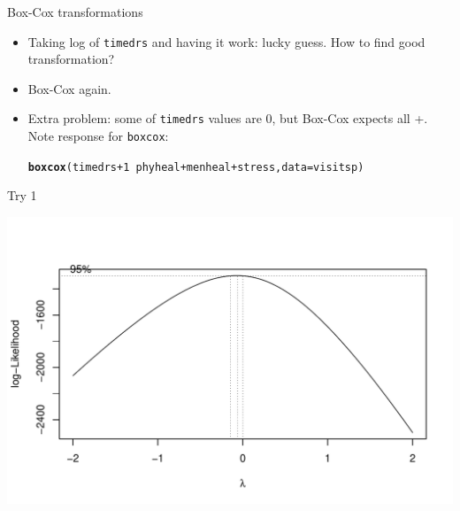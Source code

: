 \documentclass[unknownkeysallowed]{beamer}\usepackage[]{graphicx}\usepackage[]{color}
\makeatletter
\def\maxwidth{ %
  \ifdim\Gin@nat@width>\linewidth
    \linewidth
  \else
    \Gin@nat@width
  \fi
}
\newcommand{\hlnum}[1]{\textcolor[rgb]{0.686,0.059,0.569}{#1}}%
\newcommand{\hlopt}[1]{\textcolor[rgb]{0,0,0}{#1}}%
\newcommand{\hlstd}[1]{\textcolor[rgb]{0.345,0.345,0.345}{#1}}%
\newcommand{\hlkwc}[1]{\textcolor[rgb]{0.333,0.667,0.333}{#1}}%
\newcommand{\hlkwd}[1]{\textcolor[rgb]{0.737,0.353,0.396}{\textbf{#1}}}%
\newenvironment{kframe}{%
 \def\at@end@of@kframe{}%
 \ifinner\ifhmode%
  \def\at@end@of@kframe{\end{minipage}}%
  \begin{minipage}{\columnwidth}%
 \fi\fi%
 \def\FrameCommand##1{\hskip\@totalleftmargin \hskip-\fboxsep
 \colorbox{shadecolor}{##1}\hskip-\fboxsep
     \hskip-\linewidth \hskip-\@totalleftmargin \hskip\columnwidth}%
 \MakeFramed {\advance\hsize-\width
   \@totalleftmargin\z@ \linewidth\hsize
   \@setminipage}}%
 {\par\unskip\endMakeFramed%
 \at@end@of@kframe}
\newenvironment{knitrout}{}{} %
\makeatother
\begin{document}
\begin{frame}[fragile]{Box-Cox transformations}


  \begin{itemize}
  \item Taking log of \verb-timedrs- and having it work: lucky
    guess. How to find good transformation?
  \item Box-Cox again.
  \item Extra problem: some of \verb-timedrs- values are 0, but
    Box-Cox expects all +. Note response for \texttt{boxcox}:

 
\begin{knitrout}
\color{fgcolor}\begin{kframe}
\begin{alltt}
\hlkwd{boxcox}\hlstd{(timedrs}\hlopt{+}\hlnum{1}\hlopt{~}\hlstd{phyheal}\hlopt{+}\hlstd{menheal}\hlopt{+}\hlstd{stress,}\hlkwc{data}\hlstd{=visitsp)}
\end{alltt}
\end{kframe}
\end{knitrout}
  \end{itemize}

\end{frame}


\begin{frame}[fragile]{Try 1}

 
\begin{knitrout}
\color{fgcolor}
\includegraphics[width=\maxwidth]{figure/unnamed-chunk-37-1} 

\end{knitrout}
  
  
\end{frame}
\end{document}

